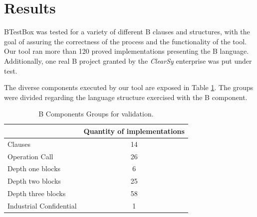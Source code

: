 \documentclass[runningheads]{llncs}
\begin{document}
\section{Results} \label{sec:Results}


BTestBox was tested for a variety of different B clauses and structures, with the goal of assuring the correctness of the process and the functionality of the tool. Our tool ran more than 120 proved implementations presenting the B language. Additionally, one real B project granted by the \textit{ClearSy} enterprise was put under test.

The diverse components executed by our tool are exposed in Table \ref{tab:ValidationGroups}. The groups were divided regarding the language structure exercised with the B component.

\begin{table}[ht]
\centering
\caption{B Components Groups for validation.}
\begin{tabular}{l|c|}
\cline{2-2}
                                        & \multicolumn{1}{l|}{Quantity of implementations} \\ \hline
\multicolumn{1}{|l|}{Clauses}           & 14                                             \\ \hline
\multicolumn{1}{|l|}{Operation Call}    & 26                                             \\ \hline
\multicolumn{1}{|l|}{Depth one blocks} & 6                                              \\ \hline
\multicolumn{1}{|l|}{Depth two blocks} & 25                                             \\ \hline
\multicolumn{1}{|l|}{Depth three blocks} & 58                                             \\ \hline
\multicolumn{1}{|l|}{Industrial Confidential} & 1
\\ \hline
\end{tabular}
\label{tab:ValidationGroups}
\end{table}
\end{document}
